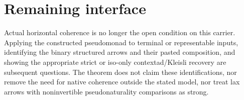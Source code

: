 \documentclass[11pt]{article}
\begin{document}
\section*{Remaining interface}
Actual horizontal coherence is no longer the open condition on this carrier. Applying the constructed pseudomonad to terminal or representable inputs, identifying the binary structured arrows and their pasted composition, and showing the appropriate strict or iso-only contextad/Kleisli recovery are subsequent questions. The theorem does not claim these identifications, nor remove the need for native coherence outside the stated model, nor treat lax arrows with noninvertible pseudonaturality comparisons as strong.
\end{document}
